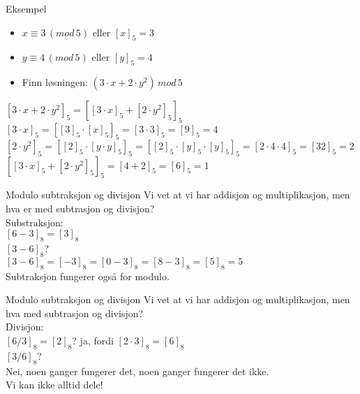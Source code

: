 \begin{frame}{}
\begin{exampleblock}{Eksempel}
\begin{itemize}
\item $x \equiv 3\,(mod\, 5)$ eller $[x]_5=3$
\item $y \equiv 4\,(mod\, 5)$ eller $[y]_5=4$
\item Finn løsningen: $(3\cdot x+2\cdot y^2)\, mod\,5$
\end{itemize}
\end{exampleblock}
\pause
\medskip

$[3\cdot x+2\cdot y^2]_5=[[3\cdot x]_5+[2\cdot y^2]_5]_5$\\

$[3\cdot x]_5=[[3]_5\cdot [x]_5]_5=[3\cdot 3]_5=[9]_5=4$\\
$[2\cdot y^2]_5=[[2]_5\cdot [y\cdot y]_5]_5=[[2]_5\cdot [y]_5\cdot[y]_5]_5=[2\cdot 4\cdot 4]_5=[32]_5=2$\\

$[[3\cdot x]_5+[2\cdot y^2]_5]_5=[4+2]_5=[6]_5=1$
\end{frame}

\begin{frame}[fragile]{Modulo subtraksjon og divisjon}
       Vi vet at vi har addisjon og multiplikasjon, men hva er med subtrasjon og divisjon?\\

Substraksjon:\\
$[6-3]_8=[3]_8$\\
$[3-6]_8$?\\
\pause
$[3-6]_8=[-3]_8=[0-3]_8=[8-3]_8=[5]_8=5$\\

Subtraksjon fungerer også for modulo.  
\end{frame}

\begin{frame}{Modulo subtraksjon og divisjon}
Vi vet at vi har addisjon og multiplikasjon, men hva med subtrasjon og divisjon?\\

Divisjon:\\
$[6/3]_8=[2]_8$? \pause ja, fordi $[2\cdot 3]_8=[6]_8$\\
$[3/6]_8$?\\
\pause
Nei, noen ganger fungerer det, noen ganger fungerer det ikke.\\

Vi kan ikke alltid dele!
\end{frame}